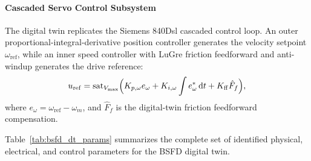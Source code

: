 \documentclass[a4paper,fleqn]{cas-dc}
\begin{document}
\paragraph{Cascaded Servo Control Subsystem}
The digital twin replicates the Siemens 840Dsl cascaded control loop. An outer proportional-integral-derivative position controller generates the velocity setpoint $\omega_{\mathrm{ref}}$, while an inner speed controller with LuGre friction feedforward and anti-windup generates the drive reference:
\begin{equation}
    u_{\mathrm{ref}} = \mathrm{sat}_{V_{\max}}\Bigl(K_{p,\omega} e_\omega + K_{i,\omega} \int e_\omega^*\,\mathrm{d}t + K_{\mathrm{ff}} \hat{F}_f\Bigr),
    \label{eq:servo_control}
\end{equation}
where $e_\omega = \omega_{\mathrm{ref}} - \omega_m$, and $\hat{F}_f$ is the digital-twin friction feedforward compensation.

Table~\ref{tab:bsfd_dt_params} summarizes the complete set of identified physical, electrical, and control parameters for the BSFD digital twin.
\end{document}
